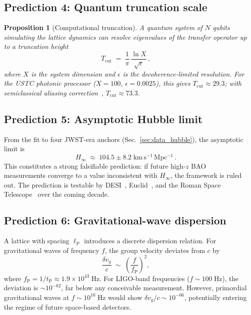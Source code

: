\documentclass[twocolumn,showpacs,preprintnumbers,amsmath,amssymb,prd]{revtex4-2}
\newtheorem{proposition}{Proposition}
\newcommand{\tP}{t_{\mathrm{P}}}
\newcommand{\lP}{\ell_{\mathrm{P}}}
\newcommand{\Hinf}{H_{\infty}}
\newcommand{\Tcut}{T_{\mathrm{cut}}}
\begin{document}
\subsection{Prediction 4: Quantum truncation scale}
\label{sec:Tcut}

\begin{proposition}[Computational truncation]\label{prop:Tcut}
A quantum system of $N$ qubits simulating the lattice dynamics
can resolve eigenvalues of the transfer operator up to a
truncation height
\begin{equation}
  \Tcut \;=\; \frac{1}{\pi}\,\frac{\ln X}{\sqrt{\epsilon}}\,,
  \label{eq:Tcut}
\end{equation}
where $X$ is the system dimension and $\epsilon$ is the
decoherence-limited resolution.
For the USTC photonic processor ($X = 100$, $\epsilon = 0.0025$),
this gives $\Tcut \approx 29.3$; with semiclassical aliasing
correction~\cite{Wang2026d}, $\Tcut \approx 73.3$.
\end{proposition}

\subsection{Prediction 5: Asymptotic Hubble limit}
\label{sec:Hinf}

From the fit to four JWST-era anchors
(Sec.~\ref{sec:data_hubble}), the asymptotic limit is
\begin{equation}
  \Hinf \;\approx\; 104.5 \pm 8.2\;\mathrm{km\,s^{-1}\,Mpc^{-1}}\,.
  \label{eq:Hinf_value}
\end{equation}
This constitutes a strong falsifiable prediction: if future
high-$z$ BAO measurements converge to a value inconsistent with
$\Hinf$, the framework is ruled out.
The prediction is testable by DESI~\cite{DESI2024},
Euclid~\cite{Euclid2024}, and the Roman Space
Telescope~\cite{Spergel2015} over the coming decade.

\subsection{Prediction 6: Gravitational-wave dispersion}
\label{sec:GW}

A lattice with spacing $\lP$ introduces a discrete dispersion
relation.
For gravitational waves of frequency $f$, the group velocity
deviates from $c$ by
\begin{equation}
  \frac{\delta v_g}{c} \;\sim\;
  \left(\frac{f}{f_{\mathrm{P}}}\right)^2,
  \label{eq:GW}
\end{equation}
where $f_{\mathrm{P}} = 1/\tP \approx 1.9 \times 10^{43}\;\mathrm{Hz}$.
For LIGO-band frequencies ($f \sim 100\;\mathrm{Hz}$), the
deviation is $\sim 10^{-82}$, far below any conceivable
measurement.
However, primordial gravitational waves at $f \sim 10^{10}\;
\mathrm{Hz}$ would show $\delta v_g/c \sim 10^{-66}$, potentially
entering the regime of future space-based detectors.
\end{document}
